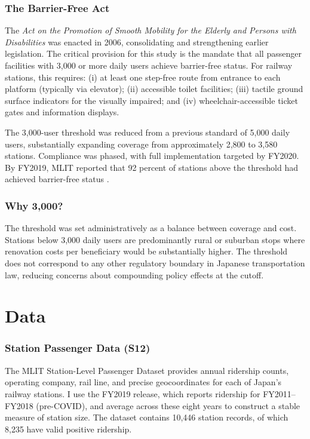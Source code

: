 \documentclass[12pt]{article}
\begin{document}
\subsubsection*{The Barrier-Free Act}  The \textit{Act on the Promotion of Smooth Mobility for the Elderly and Persons with Disabilities} was enacted in 2006, consolidating and strengthening earlier legislation. The critical provision for this study is the mandate that all passenger facilities with 3,000 or more daily users achieve barrier-free status. For railway stations, this requires: (i) at least one step-free route from entrance to each platform (typically via elevator); (ii) accessible toilet facilities; (iii) tactile ground surface indicators for the visually impaired; and (iv) wheelchair-accessible ticket gates and information displays.

The 3,000-user threshold was reduced from a previous standard of 5,000 daily users, substantially expanding coverage from approximately 2,800 to 3,580 stations. Compliance was phased, with full implementation targeted by FY2020. By FY2019, MLIT reported that 92 percent of stations above the threshold had achieved barrier-free status \citep{mlit2020}.

\subsubsection*{Why 3,000?}  The threshold was set administratively as a balance between coverage and cost. Stations below 3,000 daily users are predominantly rural or suburban stops where renovation costs per beneficiary would be substantially higher. The threshold does not correspond to any other regulatory boundary in Japanese transportation law, reducing concerns about compounding policy effects at the cutoff.


\section{Data}

\subsubsection*{Station Passenger Data (S12)}  The MLIT Station-Level Passenger Dataset provides annual ridership counts, operating company, rail line, and precise geocoordinates for each of Japan's railway stations. I use the FY2019 release, which reports ridership for FY2011--FY2018 (pre-COVID), and average across these eight years to construct a stable measure of station size. The dataset contains 10,446 station records, of which 8,235 have valid positive ridership.
\end{document}
